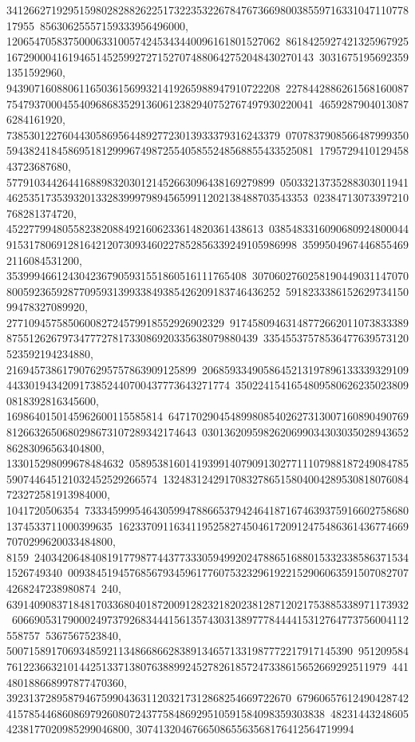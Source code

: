 {{{34126627192951598028288262251732235322678476736698003855971633104711077817955\
85630625557159333956496000, 1206547058375000633100574245343440096161801527062\
86184259274213259679251672900041619465145259927271527074880642752048430270143\
30316751956923591351592960, 9439071608806116503615699321419265988947910722208\
22784428862615681600877547937000455409686835291360612382940752767497930220041\
46592879040130876284161920, 7385301227604430586956448927723013933379316243379\
07078379085664879993505943824184586951812999674987255405855248568855433525081\
179572941012945843723687680, 577910344264416889832030121452663096438169279899\
05033213735288303011941462535173539320133283999798945659911202138488703543353\
02384713073397210768281374720, 4522779948055823820884921606233614820361438613\
03854833160906809248000449153178069128164212073093460227852856339249105986998\
35995049674468554692116084531200, 3539994661243042367905931551860516111765408\
30706027602581904490311470708005923659287709593139933849385426209183746436252\
591823338615262973415099478327089920, 277109457585060082724579918552926902329\
91745809463148772662011073833389875512626797347772781733086920335638079880439\
33545537578536477639573120523592194234880, 2169457386179076295757863909125899\
20685933490586452131978961333393291094433019434209173852440700437773643271774\
35022415416548095806262350238090818392816345600, 1698640150145962600115585814\
64717029045489980854026273130071608904907698126632650680298673107289342174643\
030136209598262069903430303502894365286283096563404800, 133015298099678484632\
05895381601419399140790913027711107988187249084785590744645121032452529266574\
13248312429170832786515804004289530818076084723272581913984000, 1041720506354\
73334599954643059947886653794246418716746393759166027586801374533711000399635\
16233709116341195258274504617209124754863614367746697070299620033484800, 8159\
24034206484081917798774437733305949920247886516880153323385863715341526749340\
00938451945768567934596177607532329619221529060635915070827074268247238980874\
240, 639140908371848170336804018720091282321820238128712021753885338971173932\
60669053179000249737926834441561357430313897778444415312764773756004112558757\
5367567523840, 50071589170693485921134866866283891346571331987772217917145390\
95120958476122366321014425133713807638899245278261857247338615652669292511979\
441480188668997877470360, 392313728958794675990436311203217312868254669722670\
67960657612490428742415785446860869792608072437758486929510591584098359303838\
482314432486054238177020985299046800, 307413204676650865563568176412564719994\
}}}
